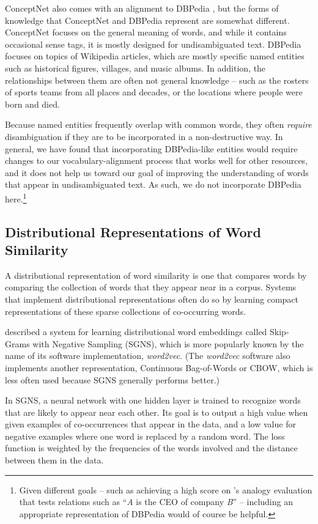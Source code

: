 \documentclass[11pt,letterpaper]{article}
\begin{document}
ConceptNet also comes with an alignment to DBPedia \cite{auer2007dbpedia}, but
the forms of knowledge that ConceptNet and DBPedia represent are somewhat
different. ConceptNet focuses on the general meaning of words, and while it
contains occasional sense tags, it is mostly designed for undisambiguated text.
DBPedia focuses on topics of Wikipedia articles, which are mostly specific
named entities such as historical figures, villages, and music albums. In
addition, the relationships between them are often not general knowledge --
such as the rosters of sports teams from all places and decades, or the
locations where people were born and died.

Because named entities frequently overlap with common words, they often {\em
require} disambiguation if they are to be incorporated in a non-destructive
way. In general, we have found that incorporating DBPedia-like entities would
require changes to our vocabulary-alignment process that works well for other
resources, and it does not help us toward our goal of improving the
understanding of words that appear in undisambiguated text. As such, we do not
incorporate DBPedia here.\footnote{
    Given different goals -- such as achieving a high score on
    's analogy evaluation that tests relations
    such as ``{\em A} is the CEO of company {\em B}'' -- including an appropriate
    representation of DBPedia would of course be helpful.
}

\subsection{Distributional Representations of Word Similarity}

A distributional representation of word similarity is one that compares words
by comparing the collection of words that they appear near in a corpus.
Systems that implement distributional representations often do so by learning
compact representations of these sparse collections of co-occurring words.

 described a system for learning distributional
word embeddings called Skip-Grams with Negative Sampling (SGNS), which is more
popularly known by the name of its software implementation, {\em word2vec}.
(The {\em word2vec} software also implements another representation, Continuous
Bag-of-Words or CBOW, which is less often used because SGNS generally performs
better.)

In SGNS, a neural network with one hidden layer is trained to recognize words
that are likely to appear near each other. Its goal is to output a high value
when given examples of co-occurrences that appear in the data, and a low value
for negative examples where one word is replaced by a random word. The loss
function is weighted by the frequencies of the words involved and the distance
between them in the data.
\end{document}
